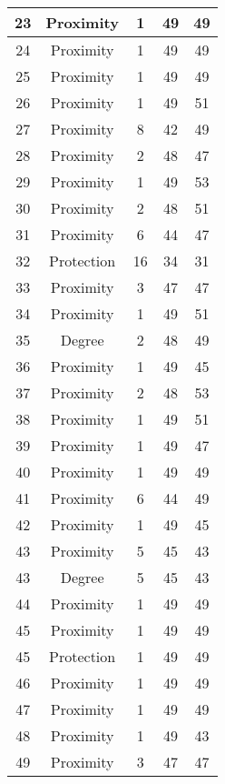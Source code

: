 \documentclass[results.tex]{subfiles}
\begin{document}
\begin{center}
\begin{tabular}{| c || c | c | c | c |}
    \hline
    23 & Proximity & 1 & 49 & 49 \\ 
    \hline
    24 & Proximity & 1 & 49 & 49 \\ 
    \hline
    25 & Proximity & 1 & 49 & 49 \\ 
    \hline
    26 & Proximity & 1 & 49 & 51 \\ 
    \hline
    27 & Proximity & 8 & 42 & 49 \\ 
    \hline
    28 & Proximity & 2 & 48 & 47 \\ 
    \hline
    29 & Proximity & 1 & 49 & 53 \\ 
    \hline
    30 & Proximity & 2 & 48 & 51 \\ 
    \hline
    31 & Proximity & 6 & 44 & 47 \\ 
    \hline
    32 & Protection & 16 & 34 & 31 \\ 
    \hline
    33 & Proximity & 3 & 47 & 47 \\ 
    \hline
    34 & Proximity & 1 & 49 & 51 \\ 
    \hline
    35 & Degree & 2 & 48 & 49 \\ 
    \hline
    36 & Proximity & 1 & 49 & 45 \\ 
    \hline
    37 & Proximity & 2 & 48 & 53 \\ 
    \hline
    38 & Proximity & 1 & 49 & 51 \\ 
    \hline
    39 & Proximity & 1 & 49 & 47 \\ 
    \hline
    40 & Proximity & 1 & 49 & 49 \\ 
    \hline
    41 & Proximity & 6 & 44 & 49 \\ 
    \hline
    42 & Proximity & 1 & 49 & 45 \\ 
    \hline
    43 & Proximity & 5 & 45 & 43 \\ 
    \hline
    43 & Degree & 5 & 45 & 43 \\ 
    \hline
    44 & Proximity & 1 & 49 & 49 \\ 
    \hline
    45 & Proximity & 1 & 49 & 49 \\ 
    \hline
    45 & Protection & 1 & 49 & 49 \\ 
    \hline
    46 & Proximity & 1 & 49 & 49 \\ 
    \hline
    47 & Proximity & 1 & 49 & 49 \\ 
    \hline
    48 & Proximity & 1 & 49 & 43 \\ 
    \hline
    49 & Proximity & 3 & 47 & 47 \\ 
    \hline   \end{tabular}
\end{center}
\end{document}
